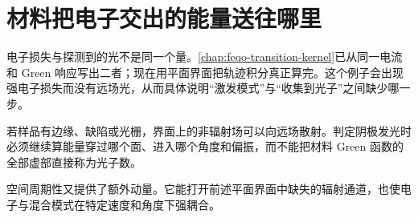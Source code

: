 \chapter{材料把电子交出的能量送往哪里}
\label{chap:feqo-material-response}

电子损失与探测到的光不是同一个量。\cref{chap:feqo-transition-kernel}已从同一电流和 Green 响应写出二者；现在用平面界面把轨迹积分真正算完。这个例子会出现强电子损失而没有远场光，从而具体说明“激发模式”与“收集到光子”之间缺少哪一步。



若样品有边缘、缺陷或光栅，界面上的非辐射场可以向远场散射。判定阴极发光时必须继续算能量穿过哪个面、进入哪个角度和偏振，而不能把材料 Green 函数的全部虚部直接称为光子数。



空间周期性又提供了额外动量。它能打开前述平面界面中缺失的辐射通道，也使电子与混合模式在特定速度和角度下强耦合。


